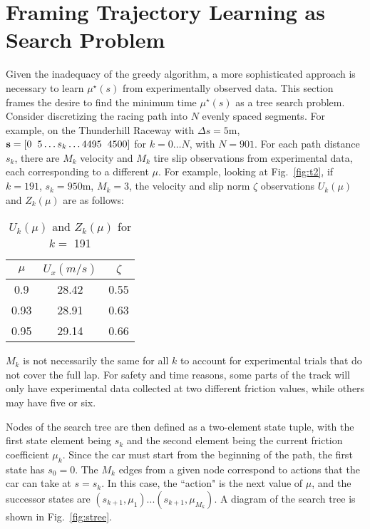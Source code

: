 {{{\section{Framing Trajectory Learning as Search \newline Problem}
\label{sec:framingTL}

Given the inadequacy of the greedy algorithm, a more sophisticated approach is necessary to learn $\mu^\star(s)$ from
experimentally observed data. This section frames the desire to find the minimum time $\mu^\star(s)$ as a tree search problem.
Consider discretizing the racing path into $N$ evenly spaced segments. For example, on the Thunderhill Raceway with
$\Delta s = 5 \mathrm{m}$, $\textbf{s} = [0 \hspace{2mm} 5 \hdots s_k \hdots 4495 \hspace{2mm} 4500]$ for $k = 0 \hdots N$, with $N = 901$. For each
path distance $s_k$, there are $M_k$ velocity and $M_k$ tire slip observations from experimental data, each corresponding to a different $\mu$. 
For example, looking at Fig.~\ref{fig:t2}, if $k = 191$, $s_k =  950 \mathrm{m}$, $M_k = 3$, the velocity and slip norm $\zeta$ observations $U_k(\mu)$ and $Z_k(\mu)$ are as follows:

\begin{table}[h]
\begin{center}
\caption{$U_k(\mu)$ and $Z_k(\mu)$ for $k =$ 191}\label{tb:laptimes}
\begin{tabular}{ccc}
$\mu $&$ U_x(m/s) $& $\zeta $\\\hline
0.9 & 28.42 & 0.55\\
0.93& 28.91 & 0.63\\
0.95& 29.14 & 0.66\\\hline
\end{tabular}
\end{center}
\end{table} 
 $M_k$ is not necessarily the same for all $k$ to account for experimental trials that do not cover the full lap. For safety and time
 reasons, some parts of the track will only have experimental data collected at two different friction values, while others may have five or six.

 Nodes of the search tree are then defined as a two-element state tuple, with the first state element being $s_k$ and the second element being the current
 friction coefficient $\mu_k$. Since the car must start from the beginning of the path, the first state has $s_0 = 0$.
 The $M_k$ edges from a given node correspond to actions that the car can take at $s = s_k$. In this case, the ``action" is the next value of $\mu$,
 and the successor states are $(s_{k+1}, \mu_1) ... (s_{k+1}, \mu_{M_k})$. A diagram of the search tree is shown in Fig.~\ref{fig:stree}.

}}}
